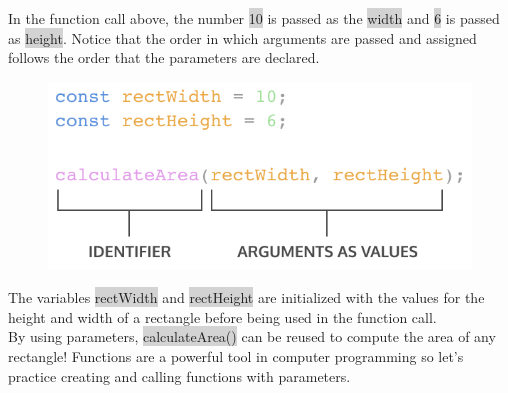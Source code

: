 \documentclass[11pt]{article}
\begin{document}
In the function call above, the number \colorbox{lightgray}{10} is passed as the \colorbox{lightgray}{width} and \colorbox{lightgray}{6} is passed as \colorbox{lightgray}{height}. Notice that the order in which arguments are passed and assigned follows the order that the parameters are declared.
\begin{figure}[H]
\includegraphics[scale = 0.73]{4_6}
\centering
\end{figure}
The variables \colorbox{lightgray}{rectWidth} and \colorbox{lightgray}{rectHeight} are initialized with the values for the height and width of a rectangle before being used in the function call. \\
\newline
By using parameters, \colorbox{lightgray}{calculateArea()} can be reused to compute the area of any rectangle! Functions are a powerful tool in computer programming so let’s practice creating and calling functions with parameters.
\end{document}
